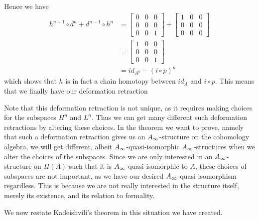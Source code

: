 Hence we have
\begin{align*}
    h^{n+1}\circ d^n + d^{n-1}\circ h^n 
    &= 
    \begin{bmatrix}
    0 & 0 & 0 \\
    0 & 0 & 0 \\
    0 & 0 & 1 
    \end{bmatrix}
    + 
    \begin{bmatrix}
    1 & 0 & 0 \\
    0 & 0 & 0 \\
    0 & 0 & 0 
    \end{bmatrix} \\
    &= 
    \begin{bmatrix}
    1 & 0 & 0 \\
    0 & 0 & 0 \\
    0 & 0 & 1
    \end{bmatrix} \\
    &= 
    id_{A^n} - (i\circ p)^n
\end{align*}
which shows that $h$ is in fact a chain homotopy between $id_A$ and $i\circ p$. This means that we finally have our deformation retraction
\begin{center}
\end{center}

Note that this deformation retraction is not unique, as it requires making choices for the subspaces $H^n$ and $L^n$. Thus we can get many different such deformation retractions by altering these choices. In the theorem we want to prove, namely that such a deformation retraction gives us an $A_{\infty}$-structure on the cohomology algebra, we will get different, albeit $A_{\infty}$-quasi-isomorphic $A_{\infty}$-structures when we alter the choices of the subspaces. Since we are only interested in an $A_{\infty}$-structure on $H(A)$ such that it is $A_{\infty}$-quasi-isomorphic to $A$, these choices of subspaces are not important, as we have our desired $A_{\infty}$-quasi-isomorphism regardless. This is because we are not really interested in the structure itself, merely its existence, and its relation to formality. 

We now restate Kadeishvili's theorem in this situation we have created.

